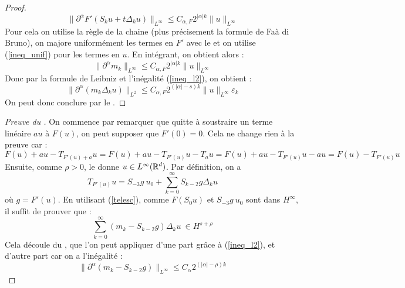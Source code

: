 \documentclass[11pt,a4paper]{article}
\begin{document}
\begin{proof}
\begin{equation*}
\| \partial^\alpha F'(S_ku + t\Delta_ku)\|_{L^{\infty}} \leq C_{\alpha,F} 2^{|\alpha|k} \|u\|_{L^{\infty}}
\end{equation*}
Pour cela on utilise la règle de la chaine (plus précisement la formule de Faà di Bruno), on majore uniformément les termes en $F'$ avec le  et on utilise (\ref{ineq_unif}) pour les termes en $u$.
En intégrant, on obtient alors :
\begin{equation*}
\|\partial^\alpha m_k \|_{L^\infty} \leq C_{\alpha,F} 2^{|\alpha|k} \|u\|_{L^{\infty}}
\end{equation*}
Donc par la formule de Leibniz et l'inégalité (\ref{ineq_l2}), on obtient :
\begin{equation*}
\|\partial^\alpha(m_k \Delta_k u) \|_{L^2} \leq C_{\alpha,F} 2^{(|\alpha|-s)k} \|u\|_{L^{\infty}} \varepsilon_k
\end{equation*}
On peut donc conclure par le .
\end{proof}

\begin{proof}[Preuve du ]

On commence par remarquer que quitte à soustraire un terme linéaire $au$ à $F(u)$, on peut supposer que $F'(0)=0$. Cela ne change rien à la preuve car :
\[F(u)+au - T_{F'(u) + a}u = F(u) + au - T_{F'(u)}u  -T_{a}u =  F(u) + au - T_{F'(u)}u  -au =  F(u) - T_{F'(u)}u \]
Ensuite, comme $\rho >0$, le  donne $u\in L^\infty(\mathbb R^d)$. Par définition, on a \[T_{F'(u)}u = S_{-3}g\ u_0 + \sum_{k=0}^\infty S_{k-2} g \Delta_k u \]
où $g= F'(u)$. En utilisant (\ref{telesc}), comme $F(S_0u)$ et $S_{-3}g \ u_0$ sont dans $H^\infty$, il suffit de prouver que :
\[\sum_{k=0}^\infty(m_k-S_{k-2}g)\Delta_k u \ \in H^{s+\rho}\]
Cela découle du , que l'on peut appliquer d'une part grâce à (\ref{ineq_l2}), et d'autre part car on a l'inégalité :
\[\| \partial^\alpha (m_k - S_{k-2}g)\|_{L^\infty} \leq C_\alpha 2^{(|\alpha|-\rho)k}\]
\end{proof}

\newpage
\printbibliography[heading=bibintoc, title={Références}]
\end{document}
